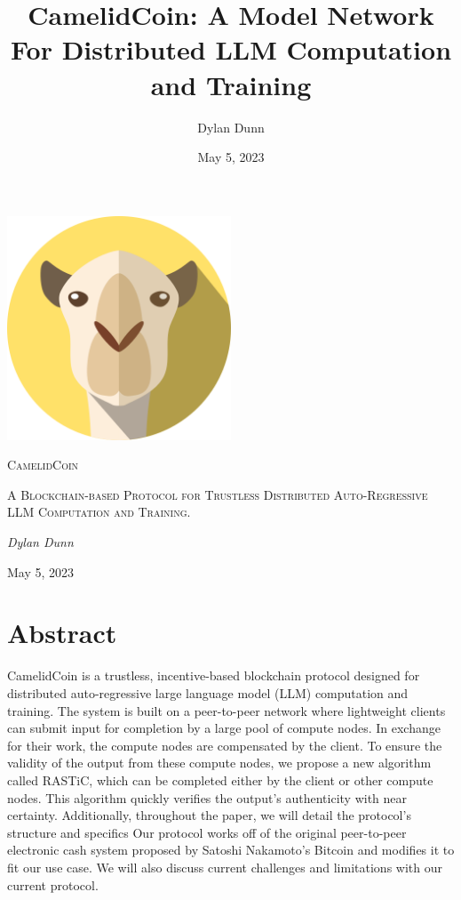 \documentclass{article}
\title{CamelidCoin: A Model Network For Distributed LLM Computation and Training}
\author{Dylan Dunn}
\date{May 5, 2023}
\begin{document}
\begin{titlepage}
    \centering
    \includegraphics[width=0.5\textwidth]{logoLarge.png}\par\vspace{1cm}
    {\fontsize{40}{48}\selectfont\scshape CamelidCoin\par}
    \vspace{1cm}
    {\scshape\Large A Blockchain-based Protocol for Trustless Distributed Auto-Regressive LLM Computation and Training. \par}
    \vspace{2cm}
    {\Large\itshape Dylan Dunn\par}
    \vfill
    {\large May 5, 2023\par}
  \end{titlepage}
  

\section{Abstract}
CamelidCoin is a trustless, incentive-based blockchain protocol designed for distributed auto-regressive large language model (LLM) computation and training. 
The system is built on a peer-to-peer network where lightweight clients can submit input for completion by a large pool of compute nodes. 
In exchange for their work, the compute nodes are compensated by the client. 
To ensure the validity of the output from these compute nodes, we propose a new algorithm called RASTiC, which can be completed either by the client or other compute nodes. 
This algorithm quickly verifies the output's authenticity with near certainty. 
Additionally, throughout the paper, we will detail the protocol's structure and specifics
Our protocol works off of the original peer-to-peer electronic cash system proposed by Satoshi Nakamoto's Bitcoin and modifies it to fit our use case. 
We will also discuss current challenges and limitations with our current protocol.
\end{document}
